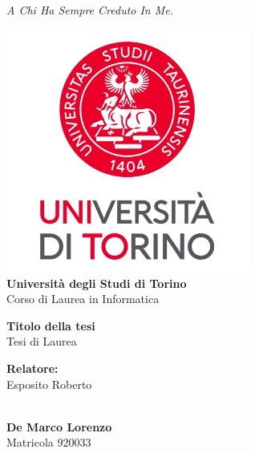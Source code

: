 \documentclass[14pt]{extbook}
\date{}
\begin{document}
\frontmatter

\clearpage
\thispagestyle{empty}
\vspace*{5cm}
\begin{flushright}
    \textit{A Chi Ha Sempre Creduto In Me.}
\end{flushright}
\clearpage

\begin{center}
    \includegraphics[width=8cm]{Images/unito-logo.png} \\
    \vspace{0.1cm}
    {\LARGE \textbf{Università degli Studi di Torino}} \\
    \vspace{0.2cm}
    {\Large {Corso di Laurea in Informatica}} \\ 
    \vspace{1cm}
    
    
    {\LARGE \textbf{Titolo della tesi}} \\ 
    \vspace{0.1cm}
    {\Large {Tesi di Laurea}} \\
    \vspace{1cm}
    
\end{center}
    
\begin{multicols}{2}
    \noindent \large{\textbf {Relatore:}} \\
    \large{Esposito Roberto} \\
    \vspace{0.1cm}

     \\
    \large{\textbf{De Marco Lorenzo}} \\
    \large {Matricola 920033}
\end{multicols}
\vspace{0.3cm}
    
\end{document}
